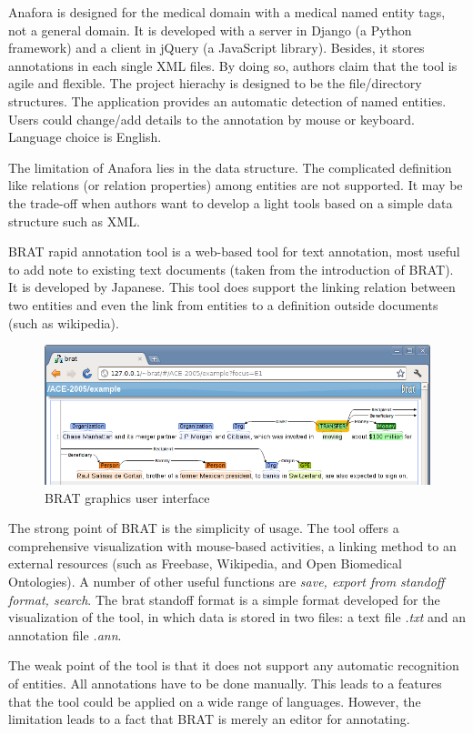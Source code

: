 Anafora is designed for the medical domain with a medical named entity tags, not a general domain. It is developed with a server in Django (a Python framework) and a client in jQuery (a JavaScript 
library). Besides, it stores annotations in each single XML files. By doing so, authors claim that the tool is agile and 
flexible. The project hierachy is designed to be the file/directory structures. The application provides an automatic detection
of named entities. Users could change/add details to the annotation by mouse or keyboard. Language choice is English.

The limitation of Anafora lies in the data structure. The complicated definition like relations (or relation properties) 
among entities are not supported. It may be the trade-off when authors want to develop a light tools based on a simple
data structure such as XML.


BRAT rapid annotation tool is a web-based tool for text annotation, most useful to add note to existing text documents 
(taken from the introduction of BRAT). It is developed by Japanese. This tool does support the linking relation between 
two entities and even the link 
from entities to a definition outside documents (such as wikipedia).

\begin{figure}[!htb]
	\centering
	\includegraphics[width=\textwidth]{DeveloperDocumentationPictures/brat}
	\caption{BRAT graphics user interface}
	\label{fig:Second}
\end{figure}

The strong point of BRAT is the simplicity of usage. The tool offers a comprehensive visualization with mouse-based 
activities, a linking method to an external resources (such as Freebase, Wikipedia, and Open Biomedical Ontologies). A number 
of other useful functions are \textit{save, export from standoff format, search}. The brat standoff format is a simple 
format developed for the visualization of the tool, in which data is stored in two files: a text file \textit{.txt} and an
annotation file \textit{.ann}.

The weak point of the tool is that it does not support any automatic recognition of entities. All annotations have to be
done manually. This leads to a features that the tool could be applied on a wide range of languages. However, the 
limitation leads to a fact that BRAT is merely an editor for annotating.

